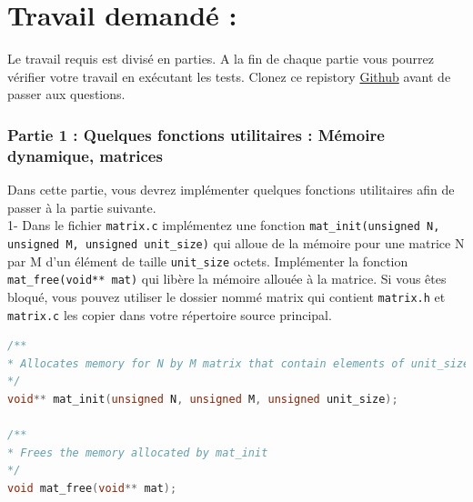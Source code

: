 \documentclass[a4paper]{article}
\begin{document}
	\section*{Travail demandé : }
	Le travail requis est divisé en parties. A la fin de chaque partie vous pourrez vérifier votre travail en exécutant les tests. 
	Clonez ce repistory \href{URL}{Github} avant de passer aux questions. \\
	
	\subsubsection*{Partie 1 : Quelques fonctions utilitaires : Mémoire dynamique, matrices}
	Dans cette partie, vous devrez implémenter quelques fonctions utilitaires afin de passer à la partie suivante. \\
	
	1- Dans le fichier \texttt{matrix.c} implémentez une fonction \texttt{mat\_init(unsigned N, unsigned M, unsigned unit\_size)} qui alloue de la mémoire pour une matrice N par M d'un élément de taille \texttt{unit\_size} octets. Implémenter la fonction \texttt{mat\_free(void** mat)} qui libère la mémoire allouée à la matrice. Si vous êtes bloqué, vous pouvez utiliser le dossier nommé matrix qui contient \texttt{matrix.h} et \texttt{matrix.c} les copier dans votre répertoire source principal.
	\begin{lstlisting}[language=C]
/**
* Allocates memory for N by M matrix that contain elements of unit_size bytes
*/ 
void** mat_init(unsigned N, unsigned M, unsigned unit_size);

/**
* Frees the memory allocated by mat_init
*/
void mat_free(void** mat);
	\end{lstlisting}
	
\end{document}

